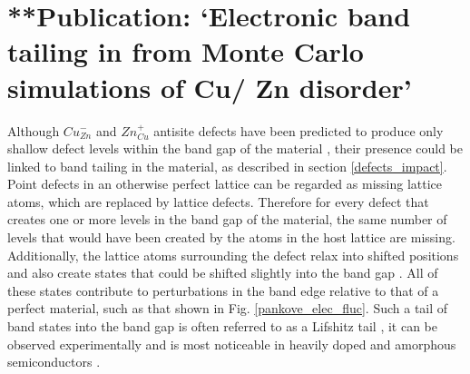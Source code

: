 \documentclass[11pt, twoside]{report}
\begin{document}





\section{**Publication: `Electronic band tailing in {\CZTS} from Monte Carlo simulations of Cu/ Zn disorder'}\label{eris_band_tailing}
Although $Cu_{Zn}^{-}$ and $Zn_{Cu}^{+}$ antisite defects have been predicted to produce only shallow defect levels within the band gap of the material \cite{defects_Chen}, their presence could be linked to band tailing in the material, as described in section \ref{defects_impact}. 
Point defects in an otherwise perfect lattice can be regarded as missing lattice atoms, which are replaced by lattice defects. Therefore for every defect that creates one or more levels in the band gap of the material, the same number of levels that would have been created by the atoms in the host lattice are missing. Additionally, the lattice atoms surrounding the defect relax into shifted positions and also create states that could be shifted slightly into the band gap \cite{thin_film_Boer}. All of these states contribute to perturbations in the band edge relative to that of a perfect material, such as that shown in Fig. \ref{pankove_elec_fluc}. Such a tail of band states into the band gap is often referred to as a Lifshitz tail \cite{Lifshitz1964}, it can be observed experimentally and is most noticeable in heavily doped and amorphous semiconductors \cite{thin_film_Boer}. 
\end{document}
